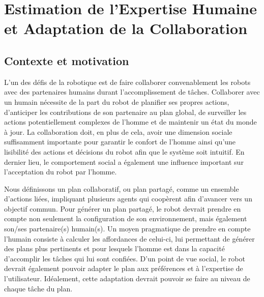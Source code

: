 \documentclass[a4paper,11pt,twoside]{StyleThese}
\begin{document}
\setcounter{chapter}{4} %
\dominitoc
\faketableofcontents
\fi

\chapter{Estimation de l'Expertise Humaine et Adaptation de la Collaboration}
\label{chapter5}
\minitoc

\section{Contexte et motivation}
L'un des défis de la robotique est de faire collaborer convenablement les robots avec des partenaires humains durant l'accomplissement de tâches. Collaborer avec un humain nécessite de la part du robot de planifier ses propres actions, d'anticiper les contributions de son partenaire au plan global, de surveiller les actions potentiellement complexes de l'homme et de maintenir un état du monde à jour. La collaboration doit, en plus de cela, avoir une dimension sociale suffisamment importante pour garantir le confort de l'homme ainsi qu'une lisibilité des actions et décisions du robot afin que le système soit intuitif. En dernier lieu, le comportement social a également une influence important sur l'acceptation du robot par l'homme.

Nous définissons un plan collaboratif, ou plan partagé, comme un ensemble d'actions liées, impliquant plusieurs agents qui coopèrent afin d'avancer vers un objectif commun.
Pour générer un plan partagé, le robot devrait prendre en compte non seulement la configuration de son environnement, mais également son/ses partenaire(s) humain(s). Un moyen pragmatique de prendre en compte l'humain consiste à calculer les affordances de celui-ci, lui permettant de générer des plans plus pertinents et pour lesquels l'homme est dans la capacité d'accomplir les tâches qui lui sont confiées. D'un point de vue social, le robot devrait également pouvoir adapter le plan aux préférences et à l'expertise de l'utilisateur. Idéalement, cette adaptation devrait pouvoir se faire au niveau de chaque tâche du plan.
\end{document}
